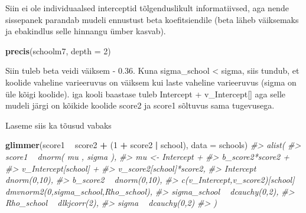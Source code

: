 \documentclass[]{book}
\newenvironment{Shaded}{\begin{snugshade}}{\end{snugshade}}
\newcommand{\KeywordTok}[1]{\textcolor[rgb]{0.13,0.29,0.53}{\textbf{#1}}}
\newcommand{\DataTypeTok}[1]{\textcolor[rgb]{0.13,0.29,0.53}{#1}}
\newcommand{\DecValTok}[1]{\textcolor[rgb]{0.00,0.00,0.81}{#1}}
\newcommand{\StringTok}[1]{\textcolor[rgb]{0.31,0.60,0.02}{#1}}
\newcommand{\CommentTok}[1]{\textcolor[rgb]{0.56,0.35,0.01}{\textit{#1}}}
\newcommand{\OperatorTok}[1]{\textcolor[rgb]{0.81,0.36,0.00}{\textbf{#1}}}
\newcommand{\NormalTok}[1]{#1}
\begin{document}
Siin ei ole individuaalsed interceptid tõlgenduslikult informatiivsed,
aga nende sissepanek parandab mudeli ennustust beta koefitsiendile (beta
läheb väiksemaks ja ebakindlus selle hinnangu ümber kasvab).

\begin{Shaded}
\begin{Highlighting}[]
\KeywordTok{precis}\NormalTok{(schoolm7, }\DataTypeTok{depth =} \DecValTok{2}\NormalTok{)}
\end{Highlighting}
\end{Shaded}

Siin tuleb beta veidi väiksem - 0.36. Kuna sigma\_school \textless{}
sigma, siis tundub, et koolide vaheline varieeruvus on väiksem kui laste
vaheline varieeruvus (sigma on üle kõigi koolide). iga kooli baastase
tuleb Intercept + v\_Intercept{[}{]} aga selle mudeli järgi on kõikide
koolide score2 ja score1 sõltuvus sama tugevusega.

Laseme siis ka tõusud vabaks

\begin{Shaded}
\begin{Highlighting}[]
\KeywordTok{glimmer}\NormalTok{(score1 }\OperatorTok{~}\StringTok{ }\NormalTok{score2 }\OperatorTok{+}\StringTok{ }\NormalTok{(}\DecValTok{1} \OperatorTok{+}\StringTok{  }\NormalTok{score2 }\OperatorTok{|}\StringTok{ }\NormalTok{school), }\DataTypeTok{data =}\NormalTok{ schools)}
\CommentTok{#> alist(}
\CommentTok{#>     score1 ~ dnorm( mu , sigma ),}
\CommentTok{#>     mu <- Intercept +}
\CommentTok{#>         b_score2*score2 +}
\CommentTok{#>         v_Intercept[school] +}
\CommentTok{#>         v_score2[school]*score2,}
\CommentTok{#>     Intercept ~ dnorm(0,10),}
\CommentTok{#>     b_score2 ~ dnorm(0,10),}
\CommentTok{#>     c(v_Intercept,v_score2)[school] ~ dmvnorm2(0,sigma_school,Rho_school),}
\CommentTok{#>     sigma_school ~ dcauchy(0,2),}
\CommentTok{#>     Rho_school ~ dlkjcorr(2),}
\CommentTok{#>     sigma ~ dcauchy(0,2)}
\CommentTok{#> )}
\end{Highlighting}
\end{Shaded}
\end{document}
